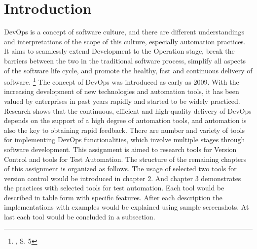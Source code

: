 \documentclass[12pt,a4paper,bibliography=totocnumbered,listof=totocnumbered]{article}
\begin{document}
{}
\renewcommand{\thesection}{\arabic{section}}
\renewcommand{\theHsection}{\arabic{section}}
\setcounter{section}{0}
\setcounter{page}{1}

\section{Introduction}
DevOps is a concept of software culture, and there are different understandings and interpretations of the scope of this culture, especially automation practices. 
It aims to seamlessly extend Development to the Operation stage, break the barriers between the two in the traditional software process, simplify all aspects of the software life cycle, and promote the healthy, fast and continuous delivery of software.
\footnote[1]{\cite{ref1}, S. 5}  
\newline
The concept of DevOps was introduced as early as 2009. With the increasing development of new technologies and automation tools, it has been valued by enterprises in past years rapidly and started to be widely practiced. 
Research shows that the continuous, efficient and high-quality delivery of DevOps depends on the support of a high degree of automation tools, and automation is also the key to obtaining rapid feedback.
There are number and variety of tools for implementing DevOps functionalities, which involve multiple stages through software development. This assignment is aimed to research tools for Version Control and tools for Test Automation.
\newline
The structure of the remaining chapters of this assignment is organized as follows. The usage of selected two tools for version control would be introduced in chapter 2. 
And chapter 3 demonstrates the practices with selected tools for test automation. Each tool would be described in table form with specific features. After each description the implementations with examples would be explained using sample screenshots.
At last each tool would be concluded in a subsection.    
\newline
\pagebreak
\end{document}
